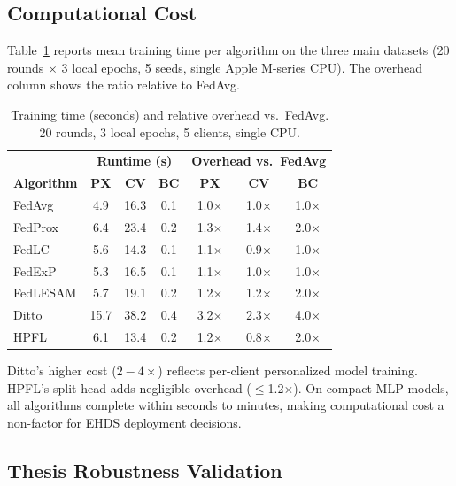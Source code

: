 \documentclass[conference]{IEEEtran}
\begin{document}
\subsection{Computational Cost}
\label{sec:computational_cost}

Table~\ref{tab:comp_cost} reports mean training time per algorithm on the three main datasets (20 rounds $\times$ 3 local epochs, 5 seeds, single Apple M-series CPU). The overhead column shows the ratio relative to FedAvg.

\begin{table}[htbp]
\centering
\caption{Training time (seconds) and relative overhead vs.\ FedAvg. 20 rounds, 3 local epochs, 5 clients, single CPU.}
\label{tab:comp_cost}
\small
\begin{tabular}{lccc|ccc}
\toprule
& \multicolumn{3}{c|}{\textbf{Runtime (s)}} & \multicolumn{3}{c}{\textbf{Overhead vs.\ FedAvg}} \\
\textbf{Algorithm} & \textbf{PX} & \textbf{CV} & \textbf{BC} & \textbf{PX} & \textbf{CV} & \textbf{BC} \\
\midrule
FedAvg   & 4.9  & 16.3 & 0.1 & 1.0$\times$ & 1.0$\times$ & 1.0$\times$ \\
FedProx  & 6.4  & 23.4 & 0.2 & 1.3$\times$ & 1.4$\times$ & 2.0$\times$ \\
FedLC    & 5.6  & 14.3 & 0.1 & 1.1$\times$ & 0.9$\times$ & 1.0$\times$ \\
FedExP   & 5.3  & 16.5 & 0.1 & 1.1$\times$ & 1.0$\times$ & 1.0$\times$ \\
FedLESAM & 5.7  & 19.1 & 0.2 & 1.2$\times$ & 1.2$\times$ & 2.0$\times$ \\
Ditto    & 15.7 & 38.2 & 0.4 & 3.2$\times$ & 2.3$\times$ & 4.0$\times$ \\
HPFL     & 6.1  & 13.4 & 0.2 & 1.2$\times$ & 0.8$\times$ & 2.0$\times$ \\
\bottomrule
\end{tabular}
\par{\footnotesize Ditto's higher cost ($2{-}4\times$) reflects per-client personalized model training. HPFL's split-head adds negligible overhead ($\leq$1.2$\times$). On compact MLP models, all algorithms complete within seconds to minutes, making computational cost a non-factor for EHDS deployment decisions.}
\end{table}

\subsection{Thesis Robustness Validation}
\label{sec:thesis_robustness_supp}
\end{document}

